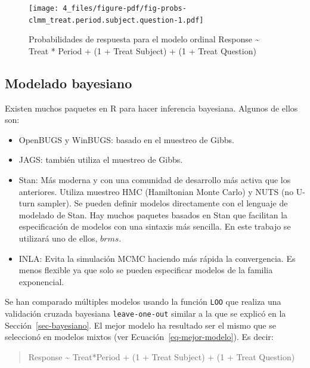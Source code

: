 \documentclass[
  12pt,
  a4paper,
  extrafontsizes,
  onecolumn,
  openright,
  table]{memoir}
\providecommand{\tightlist}{%
  \setlength{\itemsep}{0pt}\setlength{\parskip}{0pt}}\usepackage{longtable,booktabs,array}
\begin{document}
\begin{figure}[h]

{\centering \texttt{[image: 4\_files/figure-pdf/fig-probs-clmm\_treat.period.subject.question-1.pdf]}

}

\caption[Probabilidades de respuesta para el modelo ordinal
seleccionado.]{\label{fig-probs-clmm_treat.period.subject.question}Probabilidades
de respuesta para el modelo ordinal Response \textasciitilde{} Treat *
Period + (1 + Treat \textbar{} Subject) + (1 + Treat \textbar{}
Question)}

\end{figure}

\hypertarget{sec-bayesiano-2}{%
\subsection{Modelado bayesiano}\label{sec-bayesiano-2}}

Existen muchos paquetes en R para hacer inferencia bayesiana. Algunos de
ellos son:

\begin{itemize}
\tightlist
\item
  OpenBUGS y WinBUGS: basado en el muestreo de Gibbs.
\item
  JAGS: también utiliza el muestreo de Gibbs.
\item
  Stan: Más moderna y con una comunidad de desarrollo más activa que los
  anteriores. Utiliza muestreo HMC (Hamiltonian Monte Carlo) y NUTS (no
  U-turn sampler). Se pueden definir modelos directamente con el
  lenguaje de modelado de Stan. Hay muchos paquetes basados en Stan que
  facilitan la especificación de modelos con una sintaxis más sencilla.
  En este trabajo se utilizará uno de ellos, \(brms\).
\item
  INLA: Evita la simulación MCMC haciendo más rápida la convergencia. Es
  menos flexible ya que solo se pueden especificar modelos de la familia
  exponencial.
\end{itemize}

Se han comparado múltiples modelos usando la función \texttt{LOO} que
realiza una validación cruzada bayesiana \texttt{leave-one-out} similar
a la que se explicó en la Sección~\ref{sec-bayesiano}. El mejor modelo
ha resultado ser el mismo que se seleccionó en modelos mixtos (ver
Ecuación~\ref{eq-mejor-modelo}). Es decir:

\small

\begin{quote}
Response \textasciitilde{} Treat*Period + (1 + Treat \textbar{} Subject)
+ (1 + Treat \textbar{} Question) \normalsize
\end{quote}
\end{document}
